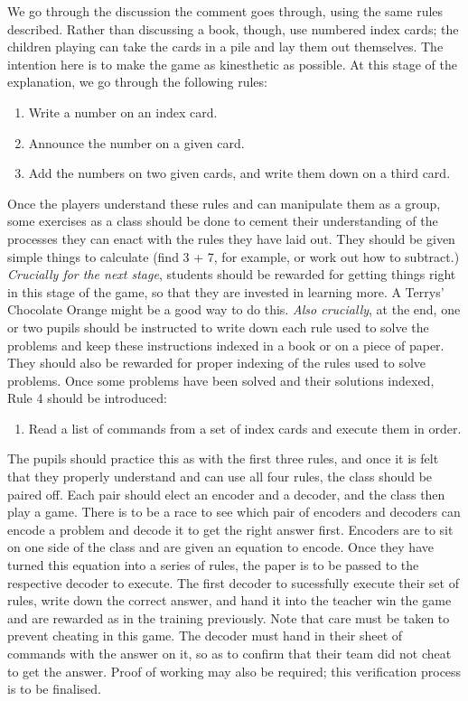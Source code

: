 \documentclass[a4paper]{article}
\begin{document}
\begin{adjustwidth}{2em}{2em}
We go through the discussion the comment goes through, using the same rules described. Rather than discussing a book, though, use numbered index cards; the children playing can take the cards in a pile and lay them out themselves. The intention here is to make the game as kinesthetic as possible. At this stage of the explanation, we go through the following rules:
\begin{enumerate}
	\item Write a number on an index card.
	\item Announce the number on a given card.
	\item Add the numbers on two given cards, and write them down on a third card.
\end{enumerate}
Once the players understand these rules and can manipulate them as a group, some exercises as a class should be done to cement their understanding of the processes they can enact with the rules they have laid out. They should be given simple things to calculate (find 3 + 7, for example, or work out how to subtract.) \emph{Crucially for the next stage}, students should be rewarded for getting things right in this stage of the game, so that they are invested in learning more. A Terrys' Chocolate Orange might be a good way to do this. \emph{Also crucially}, at the end, one or two pupils should be instructed to write down each rule used to solve the problems and keep these instructions indexed in a book or on a piece of paper. They should also be rewarded for proper indexing of the rules used to solve problems.
Once some problems have been solved and their solutions indexed, Rule 4 should be introduced: 
\begin{enumerate}\addtocounter{enumi}{3}
	\item Read a list of commands from a set of index cards and execute them in order.
\end{enumerate}
The pupils should practice this as with the first three rules, and once it is felt that they properly understand and can use all four rules, the class should be paired off. 
Each pair should elect an encoder and a decoder, and the class then play a game. There is to be a race to see which pair of encoders and decoders can encode a problem and decode it to get the right answer first. 
Encoders are to sit on one side of the class and are given an equation to encode. Once they have turned this equation into a series of rules, the paper is to be passed to the respective decoder to execute. The first decoder to sucessfully execute their set of rules, write down the correct answer, and hand it into the teacher win the game and are rewarded as in the training previously. 
Note that care must be taken to prevent cheating in this game. The decoder must hand in their sheet of commands with the answer on it, so as to confirm that their team did not cheat to get the answer. Proof of working may also be required; this verification process is to be finalised. 
\end{adjustwidth}\\
\\
\end{document}

